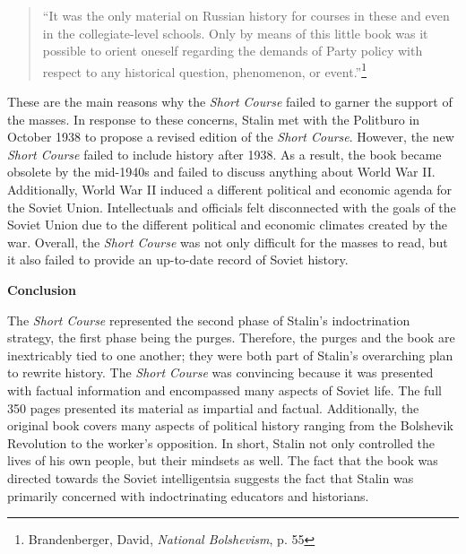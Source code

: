 \documentclass[a4paper, twocolumn]{article}
\begin{document}
\begin{quote}
``It was the only material on Russian history for courses in these and
even in the collegiate-level schools. Only by means of this little
book was it possible to orient oneself regarding the demands of Party
policy with respect to any historical question, phenomenon, or
event.''\footnote{Brandenberger, David, \emph{National Bolshevism}, p. 55}
\end{quote}


These are the main reasons why the \emph{Short Course} failed to garner the
support of the masses. In response to these concerns, Stalin met with
the Politburo in October 1938 to propose a revised edition of the
\emph{Short Course}. However, the new \emph{Short Course} failed to include history after 1938. As a result, the book became obsolete
by the mid-1940s and failed to discuss anything about World War
II. Additionally, World War II induced a different political and
economic agenda for the Soviet Union. Intellectuals and officials felt
disconnected with the goals of the Soviet Union due to the different
political and economic climates created by the war. Overall, the \emph{Short
Course} was not only difficult for the masses to read, but it also
failed to provide an up-to-date record of Soviet history.


\begin{center}\textbf{Conclusion}\end{center}

The \emph{Short Course} represented the second phase of Stalin's
indoctrination strategy, the first phase being the purges. Therefore,
the purges and the book are inextricably tied to one another; they
were both part of Stalin's overarching plan to rewrite history. The \emph{Short Course} was convincing because it was presented with
factual information and encompassed many aspects of Soviet life. The
full 350 pages presented its material as impartial and
factual. Additionally, the original book covers many aspects of
political history ranging from the Bolshevik Revolution to the
worker's opposition. In short, Stalin not only controlled the lives of
his own people, but their mindsets as well.  The fact that the book
was directed towards the Soviet intelligentsia suggests the fact that
Stalin was primarily concerned with indoctrinating educators and
historians.
\end{document}
